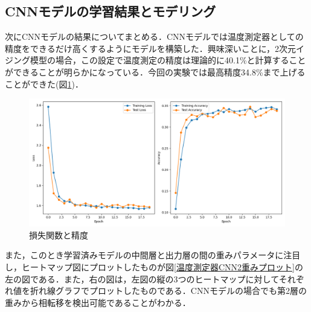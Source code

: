 \documentclass[a4paper,11pt]{jsreport}
\begin{document}
\subsection{CNNモデルの学習結果とモデリング}
次にCNNモデルの結果についてまとめる．CNNモデルでは温度測定器としての精度をできるだけ高くするようにモデルを構築した．興味深いことに，2次元イジング模型の場合，この設定で温度測定の精度は理論的に40.1\%と計算することができることが明らかになっている\cite{aoki2018}．今回の実験では最高精度34.8\%まで上げることができた(図\ref{温度測定器CNN2lossと精度})．

\begin{figure}[H]
  \begin{center}
      \includegraphics[width=\linewidth]{image/温度測定器2_L16_CNN_Nh3_loss.png}
      \caption{損失関数と精度}
      \label{温度測定器CNN2lossと精度}
  \end{center}
\end{figure}

また，このとき学習済みモデルの中間層と出力層の間の重みパラメータに注目し，ヒートマップ図にプロットしたものが図\ref{温度測定器CNN2重みプロット}の左の図である．また，右の図は，左図の縦の3つのヒートマップに対してそれぞれ値を折れ線グラフでプロットしたものである．CNNモデルの場合でも第2層の重みから相転移を検出可能であることがわかる．\par
\end{document}
